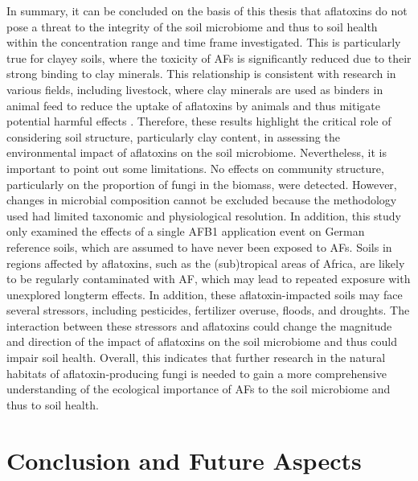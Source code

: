 In summary, it can be concluded on the basis of this thesis that aflatoxins do not pose a threat to the integrity of the soil microbiome and thus to soil health within the concentration range and time frame investigated. This is particularly true for clayey soils, where the toxicity of AFs is significantly reduced due to their strong binding to clay minerals. This relationship is consistent with research in various fields, including livestock, where clay minerals are used as binders in animal feed to reduce the uptake of aflatoxins by animals and thus mitigate potential harmful effects \citep{jaynes2007aflatoxin, wan2013toxicity, schell1993effects}. Therefore, these results highlight the critical role of considering soil structure, particularly clay content, in assessing the environmental impact of aflatoxins on the soil microbiome. Nevertheless, it is important to point out some limitations. No effects on community structure, particularly on the proportion of fungi in the biomass, were detected. However, changes in microbial composition cannot be excluded because the methodology used had limited taxonomic and physiological resolution. In addition, this study only examined the effects of a single AFB1 application event on German reference soils, which are assumed to have never been exposed to AFs. Soils in regions affected by aflatoxins, such as the (sub)tropical areas of Africa, are likely to be regularly contaminated with AF, which may lead to repeated exposure with unexplored longterm effects. In addition, these aflatoxin-impacted soils may face several stressors, including pesticides, fertilizer overuse, floods, and droughts. The interaction between these stressors and aflatoxins could change the magnitude and direction of the impact of aflatoxins on the soil microbiome and thus could impair soil health. Overall, this indicates that further research in the natural habitats of aflatoxin-producing fungi is needed to gain a more comprehensive understanding of the ecological importance of AFs to the soil microbiome and thus to soil health.

\section{Conclusion and Future Aspects}

